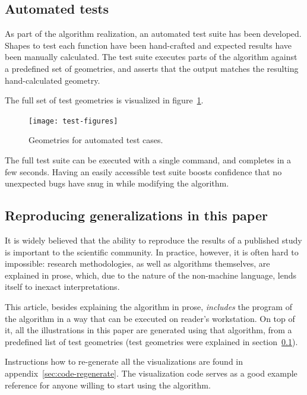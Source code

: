 \documentclass[a4paper]{article}
\begin{document}
\subsection{Automated tests}
\label{sec:automated-tests}

As part of the algorithm realization, an automated test suite has been
developed. Shapes to test each function have been hand-crafted and expected
results have been manually calculated. The test suite executes parts of the
algorithm against a predefined set of geometries, and asserts that the output
matches the resulting hand-calculated geometry.

The full set of test geometries is visualized in
figure~\ref{fig:test-figures}.

\begin{figure}[h]
    \centering
    \texttt{[image: test-figures]}
    \caption{Geometries for automated test cases.}
    \label{fig:test-figures}
\end{figure}

The full test suite can be executed with a single command, and completes in a
few seconds. Having an easily accessible test suite boosts confidence that no
unexpected bugs have snug in while modifying the algorithm.

\subsection{Reproducing generalizations in this paper}
\label{sec:reproducing-the-paper}

It is widely believed that the ability to reproduce the results of a published
study is important to the scientific community. In practice, however, it is
often hard to impossible: research methodologies, as well as algorithms
themselves, are explained in prose, which, due to the nature of the non-machine
language, lends itself to inexact interpretations.

This article, besides explaining the algorithm in prose, \emph{includes} the
program of the algorithm in a way that can be executed on reader's workstation.
On top of it, all the illustrations in this paper are generated using that
algorithm, from a predefined list of test geometries (test geometries were
explained in section~\ref{sec:automated-tests}).

Instructions how to re-generate all the visualizations are found in
appendix~\ref{sec:code-regenerate}. The visualization code serves as a good
example reference for anyone willing to start using the algorithm.
\end{document}
